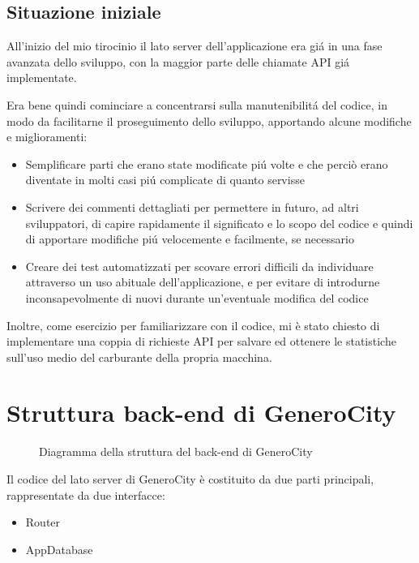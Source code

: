 \documentclass[italian, oneside]{sapthesis} %
\begin{document}
	\section{Situazione iniziale}
		All'inizio del mio tirocinio il lato server dell'applicazione era gi\'a in una fase avanzata dello sviluppo, con la maggior parte delle chiamate API gi\'a implementate.

		Era bene quindi cominciare a concentrarsi sulla manutenibilit\'a del codice, in modo da facilitarne il proseguimento dello sviluppo, apportando alcune modifiche e miglioramenti:
		\begin{itemize}
		\item Semplificare parti che erano state modificate pi\'u volte e che perci\`o erano diventate in molti casi pi\'u complicate di quanto servisse
		\item Scrivere dei commenti dettagliati per permettere in futuro, ad altri sviluppatori, di capire rapidamente il significato e lo scopo del codice  e quindi  di apportare modifiche pi\'u velocemente e facilmente, se necessario
		\item Creare dei test automatizzati per scovare errori difficili da individuare attraverso un uso abituale dell'applicazione, e per evitare di introdurne inconsapevolmente di nuovi durante un'eventuale modifica del codice
		\end{itemize}

		Inoltre, come esercizio per familiarizzare con il codice, mi \`e stato chiesto di implementare una coppia di richieste API per salvare ed ottenere le statistiche sull'uso medio del carburante della propria macchina.

\chapter{Struttura back-end di GeneroCity}
	\begin{figure}[h]
		\captionsetup{justification=centering}
		\caption{Diagramma della struttura del back-end di GeneroCity}
		\label{fig:key}
	\end{figure}
	
	\pagebreak

	Il codice del lato server di GeneroCity \`e costituito da due parti principali, rappresentate da due interfacce:
	\begin{itemize}
		\item Router
		\item AppDatabase
	\end{itemize}
\end{document}
